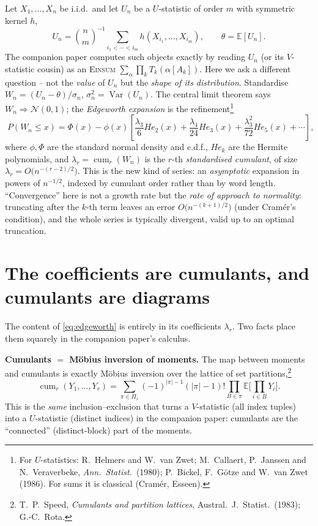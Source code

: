 \documentclass[11pt]{article}
\newcommand{\E}{\mathbb{E}}
\newcommand{\cum}{\operatorname{cum}}
\newcommand{\Var}{\operatorname{Var}}
\newcommand{\Einsum}{\textsc{Einsum}}
\newcommand{\F}[1]{\smallskip\noindent\textbf{\textsf{#1.}}\hspace{0.4em}}
\theoremstyle{plain}
\theoremstyle{definition}
\begin{document}
Let $X_1,\dots,X_n$ be i.i.d.\ and let $U_n$ be a $U$-statistic of order $m$ with
symmetric kernel $h$,
\begin{equation}
\label{eq:ustat}
   U_n=\binom{n}{m}^{-1}\!\!\sum_{i_1<\cdots<i_m} h(X_{i_1},\dots,X_{i_m}),
   \qquad \theta=\E[U_n].
\end{equation}
The companion paper computes such objects exactly by reading $U_n$ (or its
$V$-statistic cousin) as an \Einsum{} $\sum_{\alpha}\prod_k T_k(\alpha[A_k])$.
Here we ask a different question -- not the \emph{value} of $U_n$ but the
\emph{shape of its distribution}. Standardise
$W_n=(U_n-\theta)/\sigma_n$, $\sigma_n^2=\Var(U_n)$. The central limit theorem
says $W_n\Rightarrow\mathcal N(0,1)$; the \emph{Edgeworth expansion} is the
refinement\footnote{For $U$-statistics: R.~Helmers and W.~van Zwet; M.~Callaert,
P.~Janssen and N.~Veraverbeke, \emph{Ann.\ Statist.}\ (1980); P.~Bickel,
F.~G\"otze and W.~van Zwet (1986). For sums it is classical (Cram\'er, Esseen).}
\begin{equation}
\label{eq:edgeworth}
   \boxed{\;P(W_n\le x)=\Phi(x)-\phi(x)\!\left[\frac{\lambda_3}{6}He_2(x)
   +\frac{\lambda_4}{24}He_3(x)+\frac{\lambda_3^2}{72}He_5(x)+\cdots\right],\;}
\end{equation}
where $\phi,\Phi$ are the standard normal density and c.d.f., $He_k$ are the
Hermite polynomials, and $\lambda_r=\cum_r(W_n)$ is the $r$-th \emph{standardised
cumulant}, of size $\lambda_r=O\!\big(n^{-(r-2)/2}\big)$. This is the new kind of
series: an \emph{asymptotic} expansion in powers of $n^{-1/2}$, indexed by
cumulant order rather than by word length. ``Convergence'' here is not a growth
rate but the \emph{rate of approach to normality}: truncating after the $k$-th
term leaves an error $O\!\big(n^{-(k+1)/2}\big)$ (under Cram\'er's condition),
and the whole series is typically divergent, valid up to an optimal truncation.

\section{The coefficients are cumulants, and cumulants are diagrams}

The content of \eqref{eq:edgeworth} is entirely in its coefficients $\lambda_r$.
Two facts place them squarely in the companion paper's calculus.

\F{Cumulants $=$ M\"obius inversion of moments} The map between moments and
cumulants is exactly M\"obius inversion over the lattice of set
partitions,\footnote{T.~P.~Speed, \emph{Cumulants and partition lattices},
Austral.\ J.\ Statist.\ (1983); G.-C.~Rota.}
\begin{equation}
\label{eq:moebius}
   \cum_r(Y_1,\dots,Y_r)=\sum_{\pi\in\Pi_r}(-1)^{|\pi|-1}(|\pi|-1)!
   \prod_{B\in\pi}\E\Big[\textstyle\prod_{i\in B}Y_i\Big].
\end{equation}
This is the \emph{same} inclusion--exclusion that turns a $V$-statistic (all
index tuples) into a $U$-statistic (distinct indices) in the companion paper:
cumulants are the ``connected'' (distinct-block) part of the moments.
\end{document}
